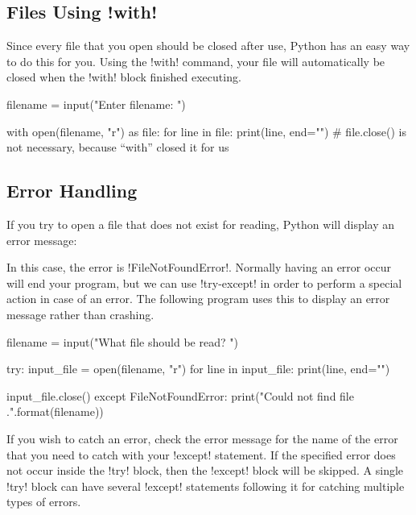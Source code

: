 \documentclass[11pt]{cselabheader}
\begin{document}
\subsection{Files Using \pythoninline!with!}
Since every file that you open should be closed after use, Python has an easy way to do this for you. Using the \pythoninline!with! command, your file will automatically be closed when the \pythoninline!with! block finished executing.

\begin{python3code}
filename = input("Enter filename: ")

with open(filename, "r") as file:
  for line in file:
    print(line, end="")
# file.close() is not necessary, because ``with'' closed it for us
\end{python3code}


\subsection{Error Handling}
If you try to open a file that does not exist for reading, Python will display
an error message:


In this case, the error is \pythoninline!FileNotFoundError!. Normally having an
error occur will end your program, but we can use \pythoninline!try-except! in
order to perform a special action in case of an error. The following program
uses this to display an error message rather than crashing.

\begin{python3code}
filename = input("What file should be read? ")

try:
  input_file = open(filename, "r")
  for line in input_file:
    print(line, end="")

  input_file.close()
except FileNotFoundError:
  print("Could not find file {}.".format(filename))
\end{python3code}

If you wish to catch an error, check the error message for the name of the error
that you need to catch with your \pythoninline!except! statement. If the specified
error does not occur inside the \pythoninline!try! block, then the
\pythoninline!except! block will be skipped. A single \pythoninline!try! block can
have several \pythoninline!except! statements following it for catching multiple
types of errors.
\end{document}
